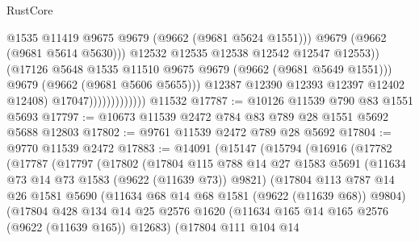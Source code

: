 \begin{lexlean}{RustCore}
\begin{coremodule}
                                          @1535
                                          @11419
                                          @9675
                                          @9679
                                          (@9662 (@9681 @5624 @1551)))
                                        @9679
                                        (@9662 (@9681 @5614 @5630)))
                                      @12532
                                      @12535
                                      @12538
                                      @12542
                                      @12547
                                      @12553))
                                  (@17126
                                    @5648
                                    @1535
                                    @11510
                                    @9675
                                    @9679
                                    (@9662 (@9681 @5649 @1551)))
                                  @9679
                                  (@9662 (@9681 @5606 @5655)))
                                @12387
                                @12390
                                @12393
                                @12397
                                @12402
                                @12408)
                              @17047)))))))))))))
    @11532
@17787 := @10126 @11539 @790 @83 @1551 @5693
@17797 := @10673 @11539 @2472 @784 @83 @789 @28 @1551 @5692 @5688 @12803
@17802 := @9761 @11539 @2472 @789 @28 @5692
@17804 := @9770 @11539 @2472
@17883 := @14091
    (@15147
      (@15794
        (@16916
          (@17782
            (@17787
              (@17797
                (@17802
                  (@17804
                    @115
                    @788
                    @14
                    @27
                    @1583
                    @5691
                    (@11634 @73 @14 @73 @1583 (@9622 (@11639 @73)) @9821)
                    (@17804
                      @113
                      @787
                      @14
                      @26
                      @1581
                      @5690
                      (@11634 @68 @14 @68 @1581 (@9622 (@11639 @68)) @9804)
                      (@17804
                        @428
                        @134
                        @14
                        @25
                        @2576
                        @1620
                        (@11634 @165 @14 @165 @2576 (@9622 (@11639 @165)) @12683)
                        (@17804
                          @111
                          @104
                          @14

\end{coremodule}
\end{lexlean}
